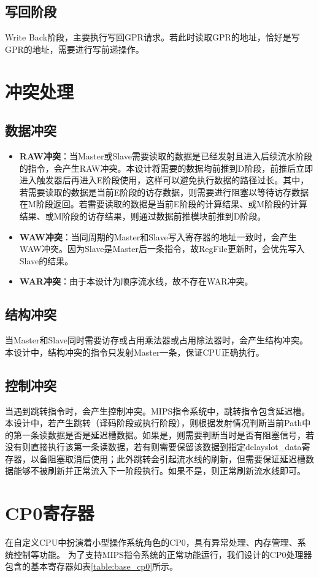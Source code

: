 \subsection{写回阶段}
Write Back阶段，主要执行写回GPR请求。若此时读取GPR的地址，恰好是写GPR的地址，需要进行写前递操作。

\section{冲突处理}
\subsection{数据冲突}
\begin{itemize}
    \item \textbf{RAW冲突}：当Master或Slave需要读取的数据是已经发射且进入后续流水阶段的指令，会产生RAW冲突。本设计将需要的数据均前推到D阶段，前推后立即进入触发器后再进入E阶段使用，这样可以避免执行数据的路径过长。其中，若需要读取的数据是当前E阶段的访存数据，则需要进行阻塞以等待访存数据在M阶段返回。若需要读取的数据是当前E阶段的计算结果、或M阶段的计算结果、或M阶段的访存结果，则通过数据前推模块前推到D阶段。
    \item \textbf{WAW冲突}：当同周期的Master和Slave写入寄存器的地址一致时，会产生WAW冲突。因为Slave是Master后一条指令，故RegFile更新时，会优先写入Slave的结果。
    \item \textbf{WAR冲突}：由于本设计为顺序流水线，故不存在WAR冲突。
\end{itemize}

\subsection{结构冲突}
当Master和Slave同时需要访存或占用乘法器或占用除法器时，会产生结构冲突。本设计中，结构冲突的指令只发射Master一条，保证CPU正确执行。

\subsection{控制冲突}
当遇到跳转指令时，会产生控制冲突。MIPS指令系统中，跳转指令包含延迟槽。本设计中，若产生跳转（译码阶段或执行阶段），则根据发射情况判断当前Path中的第一条读数据是否是延迟槽数据。如果是，则需要判断当时是否有阻塞信号，若没有则直接执行该第一条读数据，若有则需要保留该数据到指定delayslot\_data寄存器，以备阻塞取消后使用；此外跳转会引起流水线的刷新，但需要保证延迟槽数据能够不被刷新并正常流入下一阶段执行。如果不是，则正常刷新流水线即可。

\section{CP0寄存器}
在自定义CPU中扮演着小型操作系统角色的CP0，具有异常处理、内存管理、系统控制等功能。
为了支持MIPS指令系统的正常功能运行，我们设计的CP0处理器包含的基本寄存器如表\ref{table:base_cp0}所示。

